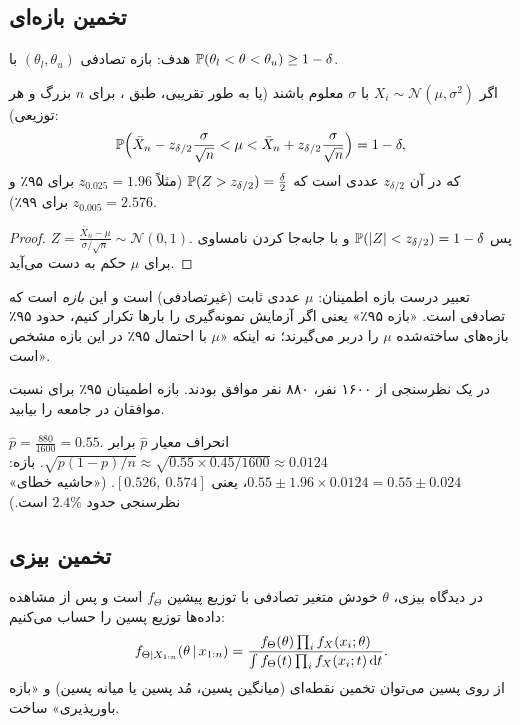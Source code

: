 \subsection{تخمین بازه‌ای}
هدف: بازه تصادفی $(\theta_l,\theta_u)$ با $\mathbb{P}(\theta_l<\theta<\theta_u)\ge1-\delta$.

\begin{theorem}
اگر $X_i\sim\mathcal N(\mu,\sigma^2)$ با $\sigma$ معلوم باشند (یا به طور تقریبی، طبق ، برای $n$ بزرگ و هر توزیعی):
\[
\mathbb{P}\Big(\bar X_n-z_{\delta/2}\frac{\sigma}{\sqrt n}<\mu<\bar X_n+z_{\delta/2}\frac{\sigma}{\sqrt n}\Big)=1-\delta,
\]
که در آن $z_{\delta/2}$ عددی است که $\mathbb{P}(Z>z_{\delta/2})=\frac\delta2$ (مثلاً $z_{0.025}=1.96$ برای ۹۵٪ و $z_{0.005}=2.576$ برای ۹۹٪).
\end{theorem}
\begin{proof}
$Z=\frac{\bar X_n-\mu}{\sigma/\sqrt n}\sim\mathcal N(0,1)$. پس $\mathbb{P}(|Z|<z_{\delta/2})=1-\delta$ و با جابه‌جا کردن نامساوی برای $\mu$ حکم به دست می‌آید.
\end{proof}

\begin{warning}
\warntitle تعبیر درست بازه اطمینان: $\mu$ عددی ثابت (غیرتصادفی) است و این \emph{بازه} است که تصادفی است. «بازه ۹۵٪» یعنی اگر آزمایش نمونه‌گیری را بارها تکرار کنیم، حدود ۹۵٪ بازه‌های ساخته‌شده $\mu$ را دربر می‌گیرند؛ نه اینکه «$\mu$ با احتمال ۹۵٪ در این بازه مشخص است».
\end{warning}

\begin{example}[نظرسنجی]
در یک نظرسنجی از ۱۶۰۰ نفر، ۸۸۰ نفر موافق بودند. بازه اطمینان ۹۵٪ برای نسبت موافقان در جامعه را بیابید.
\begin{solution}
$\hat p=\frac{880}{1600}=0.55$. انحراف معیار $\hat p$ برابر $\sqrt{p(1-p)/n}\approx\sqrt{0.55\times0.45/1600}\approx0.0124$. بازه: $0.55\pm1.96\times0.0124=0.55\pm0.024$، یعنی $[0.526,\ 0.574]$. («حاشیه خطای» نظرسنجی حدود $2.4\%$ است.)
\end{solution}
\end{example}

\subsection{تخمین بیزی}
در دیدگاه بیزی، $\theta$ خودش متغیر تصادفی با توزیع پیشین $f_\Theta$ است و پس از مشاهده داده‌ها توزیع پسین را حساب می‌کنیم:
\[
f_{\Theta|X_{1:n}}(\theta\,|\, x_{1:n})=\frac{f_\Theta(\theta)\prod_{i}f_X(x_i;\theta)}{\int f_\Theta(t)\prod_if_X(x_i;t)\,\mathrm{d} t}.
\]
از روی پسین می‌توان تخمین نقطه‌ای (میانگین پسین، مُد پسین یا میانه پسین) و «بازه باورپذیری» ساخت.

